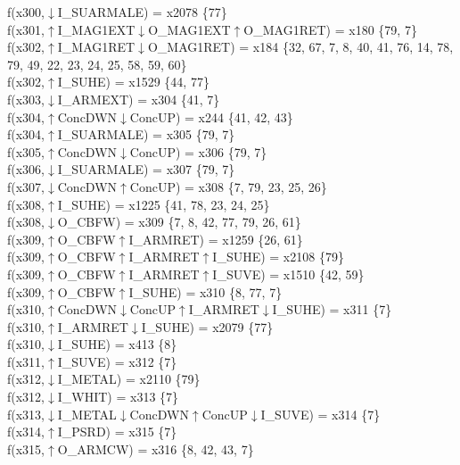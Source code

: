 f(x300,$\downarrow$I\_SUARMALE) = x2078 \{77\} \\  
f(x301,$\uparrow$I\_MAG1EXT$\downarrow$O\_MAG1EXT$\uparrow$O\_MAG1RET) = x180 \{79, 7\} \\  
f(x302,$\uparrow$I\_MAG1RET$\downarrow$O\_MAG1RET) = x184 \{32, 67, 7, 8, 40, 41, 76, 14, 78, 79, 49, 22, 23, 24, 25, 58, 59, 60\} \\  
f(x302,$\uparrow$I\_SUHE) = x1529 \{44, 77\} \\  
f(x303,$\downarrow$I\_ARMEXT) = x304 \{41, 7\} \\  
f(x304,$\uparrow$ConcDWN$\downarrow$ConcUP) = x244 \{41, 42, 43\} \\  
f(x304,$\uparrow$I\_SUARMALE) = x305 \{79, 7\} \\  
f(x305,$\uparrow$ConcDWN$\downarrow$ConcUP) = x306 \{79, 7\} \\  
f(x306,$\downarrow$I\_SUARMALE) = x307 \{79, 7\} \\  
f(x307,$\downarrow$ConcDWN$\uparrow$ConcUP) = x308 \{7, 79, 23, 25, 26\} \\  
f(x308,$\uparrow$I\_SUHE) = x1225 \{41, 78, 23, 24, 25\} \\  
f(x308,$\downarrow$O\_CBFW) = x309 \{7, 8, 42, 77, 79, 26, 61\} \\  
f(x309,$\uparrow$O\_CBFW$\uparrow$I\_ARMRET) = x1259 \{26, 61\} \\  
f(x309,$\uparrow$O\_CBFW$\uparrow$I\_ARMRET$\uparrow$I\_SUHE) = x2108 \{79\} \\  
f(x309,$\uparrow$O\_CBFW$\uparrow$I\_ARMRET$\uparrow$I\_SUVE) = x1510 \{42, 59\} \\  
f(x309,$\uparrow$O\_CBFW$\uparrow$I\_SUHE) = x310 \{8, 77, 7\} \\  
f(x310,$\uparrow$ConcDWN$\downarrow$ConcUP$\uparrow$I\_ARMRET$\downarrow$I\_SUHE) = x311 \{7\} \\  
f(x310,$\uparrow$I\_ARMRET$\downarrow$I\_SUHE) = x2079 \{77\} \\  
f(x310,$\downarrow$I\_SUHE) = x413 \{8\} \\  
f(x311,$\uparrow$I\_SUVE) = x312 \{7\} \\  
f(x312,$\downarrow$I\_METAL) = x2110 \{79\} \\  
f(x312,$\downarrow$I\_WHIT) = x313 \{7\} \\  
f(x313,$\downarrow$I\_METAL$\downarrow$ConcDWN$\uparrow$ConcUP$\downarrow$I\_SUVE) = x314 \{7\} \\  
f(x314,$\uparrow$I\_PSRD) = x315 \{7\} \\  
f(x315,$\uparrow$O\_ARMCW) = x316 \{8, 42, 43, 7\} \\  
